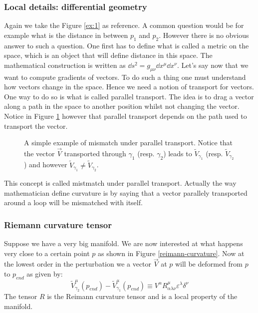 \documentclass[10pt,a4paper]{book}
\begin{document}
\subsubsection{Local details: differential geometry}
Again we take the Figure \ref{ex:1} as reference. A common question would be for example what is the distance in between $p_1$ and $p_2$. However there is no obvious answer to such a question. One first has to define what is called a metric on the space, which is an object that will define distance in this space. The mathematical construction is written as $\dd s^2 = g_{\mu \nu} \dd x^\mu \dd x^\nu$. Let's say now that we want to compute gradients of vectors. To do such a thing one must understand how vectors change in the space. Hence we need a notion of transport for vectors. One way to do so is what is called parallel transport. The idea is to drag a vector along a path in the space to another position whilst not changing the vector. Notice in Figure \ref{parallel transport} however that parallel transport depends on the path used to transport the vector.
\begin{figure}[h] \label{parallel transport}
\centering
{}
\caption{A simple example of mismatch under parallel transport. Notice that the vector $\vec{V}$ transported through $\gamma_1$ (resp. $\gamma_2$) leads to $\tilde{V}_{\gamma_1}$ (resp.  $\tilde{V}_{\gamma_2}$) and however $\tilde{V}_{\gamma_1} \neq  \tilde{V}_{\gamma_2}$.}
\end{figure}
This concept is called mistmatch under parallel transport. Actually the way mathematician define curvature is by saying that a vector parallely transported around a loop will be mismatched with itself.

\subsubsection{Riemann curvature tensor}
Suppose we have a very big manifold. We are now interested at what happens very close to a certain point $p$ as shown in Figure \ref{reimann-curvature}. Now at the lowest order in the perturbation we a vector $\overrightarrow{V}$ at $p$ will be deformed from $p$ to $p_{end}$ as given by:
\[
\tilde{V}^\mu_{\gamma_2} (p_{end}) - \tilde{V}^\mu_{\gamma_1}(p_{end}) \equiv V^\alpha R_{\alpha \lambda \nu}^{\mu} \varepsilon^\lambda \delta^\nu
\]
The tensor $R$ is the Reimann curvature tensor and is a local property of the manifold.
\end{document}
